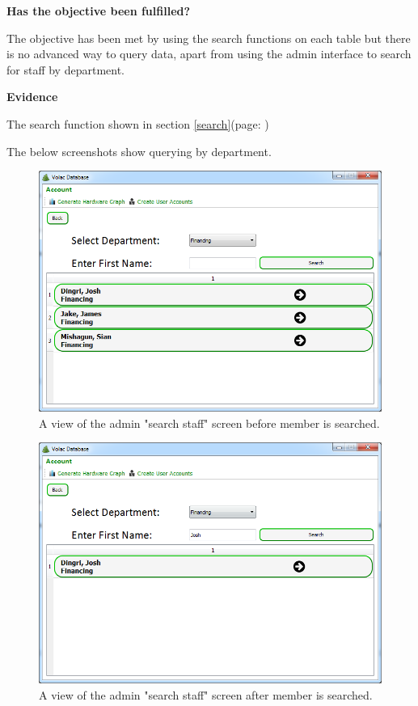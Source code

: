 \textbf{Has the objective been fulfilled?}

The objective has been met by using the search functions on each table but there is no advanced way to query data, apart from using the admin interface to search for staff by department. 

\textbf{Evidence}

The search function shown in section \ref{search}(page: \pageref{search})

The below screenshots show querying by department.

\begin{figure}[H]
    \includegraphics[width=\textwidth]{./Evaluation/Images/beforeadv.png}
    \caption{A view of the admin "search staff" screen before member is searched.} 
\end{figure}

\begin{figure}[H]
    \includegraphics[width=\textwidth]{./Evaluation/Images/afteradv.png}
    \caption{A view of the admin "search staff" screen after member is searched.} 
\end{figure}



